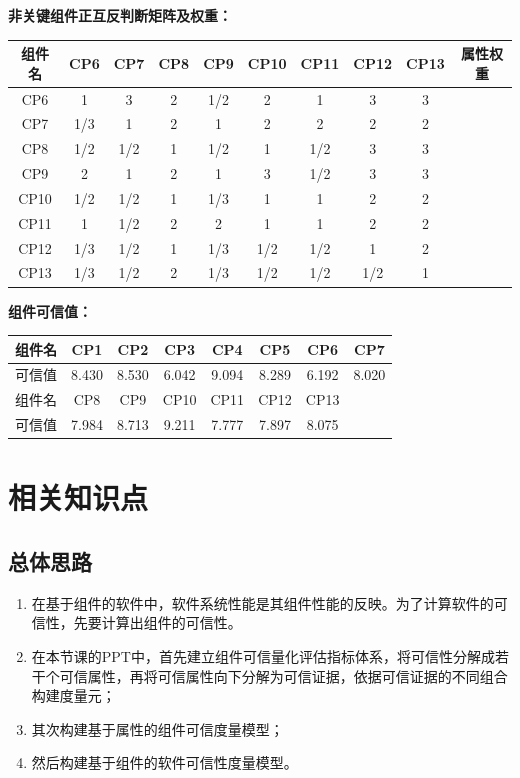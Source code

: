 \documentclass{article}
\begin{document}
\textbf{非关键组件正互反判断矩阵及权重：}

\begin{center}
	\begin{tabular}{|c|c|c|c|c|c|c|c|c|c|}
		\hline
		组件名 & CP6 & CP7 & CP8 & CP9 & CP10 & CP11 & CP12 & CP13 & 属性权重 \\
		\hline
		CP6 & 1 & 3 & 2 & 1/2 & 2 & 1 & 3 & 3 & \\
		\hline
		CP7 & 1/3 & 1 & 2 & 1 & 2 & 2 & 2 & 2 & \\
		\hline
		CP8 & 1/2 & 1/2 & 1 & 1/2 & 1 & 1/2 & 3 & 3 & \\
		\hline
		CP9 & 2 & 1 & 2 & 1 & 3 & 1/2 & 3 & 3 & \\
		\hline
		CP10 & 1/2 & 1/2 & 1 & 1/3 & 1 & 1 & 2 & 2 & \\
		\hline
		CP11 & 1 & 1/2 & 2 & 2 & 1 & 1 & 2 & 2 & \\
		\hline
		CP12 & 1/3 & 1/2 & 1 & 1/3 & 1/2 & 1/2 & 1 & 2 & \\
		\hline
		CP13 & 1/3 & 1/2 & 2 & 1/3 & 1/2 & 1/2 & 1/2 & 1 & \\
		\hline
	\end{tabular}
\end{center}

\textbf{组件可信值：}

\begin{center}
	\begin{tabular}{|c|c|c|c|c|c|c|c|}
		\hline
		组件名 & CP1 & CP2 & CP3 & CP4 & CP5 & CP6 & CP7 \\
		\hline
		可信值 & 8.430 & 8.530 & 6.042 & 9.094 & 8.289 & 6.192 & 8.020 \\
		\hline
		组件名 & CP8 & CP9 & CP10 & CP11 & CP12 & CP13 & \\
		\hline
		可信值 & 7.984 & 8.713 & 9.211 & 7.777 & 7.897 & 8.075 & \\
		\hline
	\end{tabular}
\end{center}

\normalsize

\section{相关知识点}

\subsection{总体思路}

\begin{enumerate}
	\item 在基于组件的软件中，软件系统性能是其组件性能的反映。为了计算软件的可信性，先要计算出组件的可信性。
	\item 在本节课的PPT中，首先建立组件可信量化评估指标体系，将可信性分解成若干个可信属性，再将可信属性向下分解为可信证据，依据可信证据的不同组合构建度量元；
	\item 其次构建基于属性的组件可信度量模型；
	\item 然后构建基于组件的软件可信性度量模型。
\end{enumerate}
\end{document}
